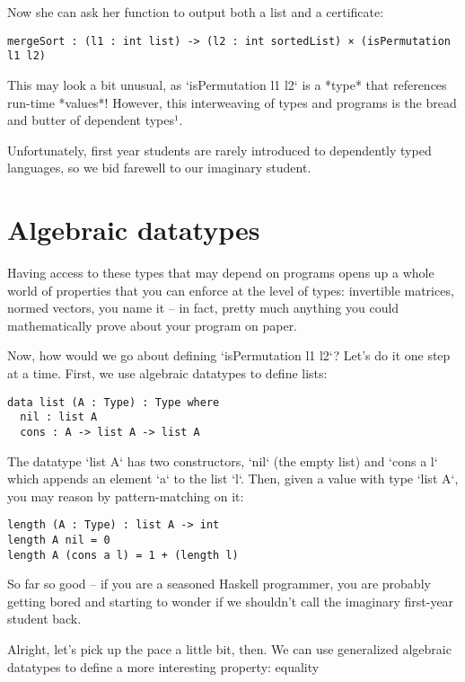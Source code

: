 Now she can ask her function to output both a list and a certificate:

\begin{lstlisting}[style=kaolstplain,linewidth=1.5\textwidth]
     mergeSort : (l1 : int list) -> (l2 : int sortedList) × (isPermutation l1 l2)
\end{lstlisting}

This may look a bit unusual, as `isPermutation l1 l2` is a *type* that references
run-time *values*! However, this interweaving of types and programs is the bread and
butter of dependent types¹.

Unfortunately, first year students are rarely introduced to dependently typed
languages, so we bid farewell to our imaginary student.

\section{Algebraic datatypes}

Having access to these types that may depend on programs opens up a whole world
of properties that you can enforce at the level of types: invertible matrices,
normed vectors, you name it -- in fact, pretty much anything you could mathematically
prove about your program on paper.

Now, how would we go about defining `isPermutation l1 l2`?
Let's do it one step at a time. First, we use algebraic datatypes to define lists:

\begin{lstlisting}[style=kaolstplain,linewidth=1.5\textwidth]
data list (A : Type) : Type where
  nil : list A
  cons : A -> list A -> list A
\end{lstlisting}

The datatype `list A` has two constructors, `nil` (the empty list) and `cons a l`
which appends an element `a` to the list `l`. Then, given a value with type `list A`, you
may reason by pattern-matching on it:

\begin{lstlisting}[style=kaolstplain,linewidth=1.5\textwidth]
length (A : Type) : list A -> int
length A nil = 0
length A (cons a l) = 1 + (length l)
\end{lstlisting}

So far so good -- if you are a seasoned Haskell programmer, you are probably getting
bored and starting to wonder if we shouldn't call the imaginary first-year student back.

Alright, let's pick up the pace a little bit, then. We can use generalized algebraic
datatypes to define a more interesting property: equality

